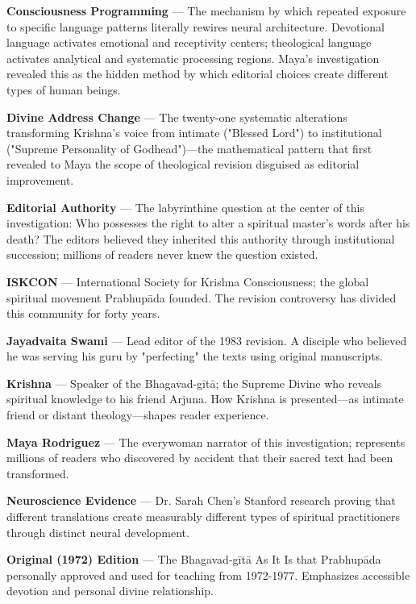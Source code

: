 \documentclass[11pt,twoside]{book}
\begin{document}
\textbf{\textbf{Consciousness Programming}} — The mechanism by which repeated exposure to specific language patterns literally rewires neural architecture. Devotional language activates emotional and receptivity centers; theological language activates analytical and systematic processing regions. Maya's investigation revealed this as the hidden method by which editorial choices create different types of human beings.

\textbf{\textbf{Divine Address Change}} — The twenty-one systematic alterations transforming Krishna's voice from intimate ("Blessed Lord") to institutional ("Supreme Personality of Godhead")—the mathematical pattern that first revealed to Maya the scope of theological revision disguised as editorial improvement.

\textbf{\textbf{Editorial Authority}} — The labyrinthine question at the center of this investigation: Who possesses the right to alter a spiritual master's words after his death? The editors believed they inherited this authority through institutional succession; millions of readers never knew the question existed.

\textbf{\textbf{ISKCON}} — International Society for Krishna Consciousness; the global spiritual movement Prabhupāda founded. The revision controversy has divided this community for forty years.

\textbf{\textbf{Jayadvaita Swami}} — Lead editor of the 1983 revision. A disciple who believed he was serving his guru by "perfecting" the texts using original manuscripts.

\textbf{\textbf{Krishna}} — Speaker of the Bhagavad-gītā; the Supreme Divine who reveals spiritual knowledge to his friend Arjuna. How Krishna is presented—as intimate friend or distant theology—shapes reader experience.

\textbf{\textbf{Maya Rodriguez}} — The everywoman narrator of this investigation; represents millions of readers who discovered by accident that their sacred text had been transformed.

\textbf{\textbf{Neuroscience Evidence}} — Dr. Sarah Chen's Stanford research proving that different translations create measurably different types of spiritual practitioners through distinct neural development.

\textbf{\textbf{Original (1972) Edition}} — The Bhagavad-gītā As It Is that Prabhupāda personally approved and used for teaching from 1972-1977. Emphasizes accessible devotion and personal divine relationship.
\end{document}
